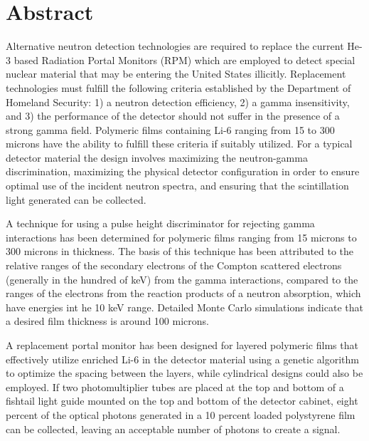 \chapter*{Abstract}
\label{chap:abstract}
Alternative neutron detection technologies are required to replace the current He-3 based Radiation Portal Monitors (RPM) which are employed to detect special nuclear material that may be entering the United States illicitly.
Replacement technologies must fulfill the following criteria established by the Department of Homeland Security: 1) a neutron detection efficiency, 2) a gamma insensitivity, and 3) the performance of the detector should not suffer in the presence of a strong gamma field.
Polymeric films containing Li-6 ranging from 15 to 300 microns have the ability to fulfill these criteria if suitably utilized.
For a typical detector material the design involves maximizing the neutron-gamma discrimination, maximizing the physical detector configuration in order to ensure optimal use of the incident neutron spectra, and ensuring that the scintillation light generated can be collected.

A technique for using a pulse height discriminator for rejecting gamma interactions has been determined for polymeric films  ranging from 15 microns to 300 microns in thickness.
The basis of this technique has been attributed to the relative ranges of the secondary electrons of the Compton scattered electrons (generally in the hundred of keV) from the gamma interactions, compared to the ranges of the electrons from the reaction products of a neutron absorption, which have energies int he 10 keV range.
Detailed Monte Carlo simulations indicate that a desired film thickness is around 100 microns.

A replacement portal monitor has been designed for layered polymeric films that effectively utilize enriched Li-6 in the detector material using a genetic algorithm to optimize the spacing between the layers, while cylindrical designs could also be employed.
If two photomultiplier tubes are placed at the top and bottom of a fishtail light guide mounted on the top and bottom of the detector cabinet, eight percent of the optical photons generated in a 10 percent loaded polystyrene film can be collected, leaving an acceptable number of photons to create a signal.
